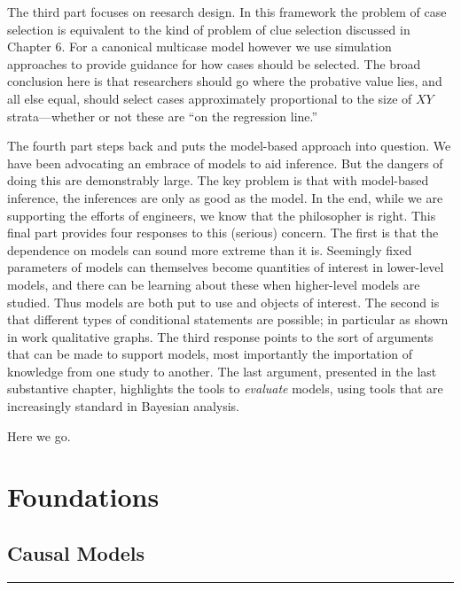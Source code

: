 \documentclass[12pt,]{book}
\begin{document}
The third part focuses on reesarch design. In this framework the problem of case selection is equivalent to the kind of problem of clue selection discussed in Chapter 6. For a canonical multicase model however we use simulation approaches to provide guidance for how cases should be selected. The broad conclusion here is that researchers should go where the probative value lies, and all else equal, should select cases approximately proportional to the size of \(XY\) strata---whether or not these are ``on the regression line.''

The fourth part steps back and puts the model-based approach into question. We have been advocating an embrace of models to aid inference. But the dangers of doing this are demonstrably large. The key problem is that with model-based inference, the inferences are only as good as the model. In the end, while we are supporting the efforts of engineers, we know that the philosopher is right. This final part provides four responses to this (serious) concern. The first is that the dependence on models can sound more extreme than it is. Seemingly fixed parameters of models can themselves become quantities of interest in lower-level models, and there can be learning about these when higher-level models are studied. Thus models are both put to use and objects of interest. The second is that different types of conditional statements are possible; in particular as shown in work qualitative graphs. The third response points to the sort of arguments that can be made to support models, most importantly the importation of knowledge from one study to another. The last argument, presented in the last substantive chapter, highlights the tools to \emph{evaluate} models, using tools that are increasingly standard in Bayesian analysis.

Here we go.

\hypertarget{part-foundations}{%
\part{Foundations}\label{part-foundations}}

\hypertarget{models}{%
\chapter{Causal Models}\label{models}}

\begin{center}\rule{0.5\linewidth}{\linethickness}\end{center}
\end{document}
